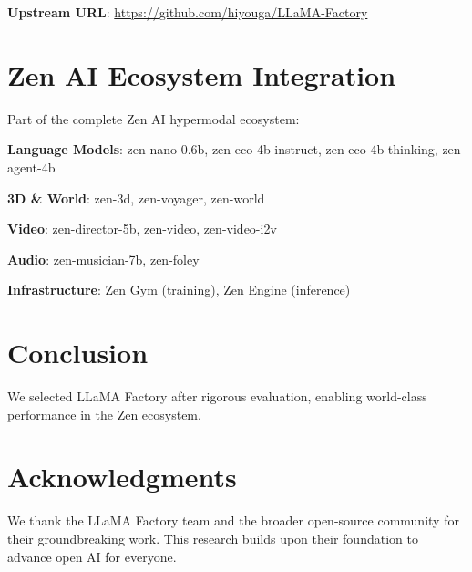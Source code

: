 \documentclass[11pt,a4paper]{article}
\begin{document}
\textbf{Upstream URL}: \url{https://github.com/hiyouga/LLaMA-Factory}

\section{Zen AI Ecosystem Integration}

Part of the complete Zen AI hypermodal ecosystem:

\textbf{Language Models}: zen-nano-0.6b, zen-eco-4b-instruct, zen-eco-4b-thinking, zen-agent-4b

\textbf{3D \& World}: zen-3d, zen-voyager, zen-world

\textbf{Video}: zen-director-5b, zen-video, zen-video-i2v

\textbf{Audio}: zen-musician-7b, zen-foley

\textbf{Infrastructure}: Zen Gym (training), Zen Engine (inference)

\section{Conclusion}
We selected LLaMA Factory after rigorous evaluation, enabling world-class performance in the Zen ecosystem.

\section*{Acknowledgments}
We thank the LLaMA Factory team and the broader open-source community for their groundbreaking work. This research builds upon their foundation to advance open AI for everyone.



\end{document}
